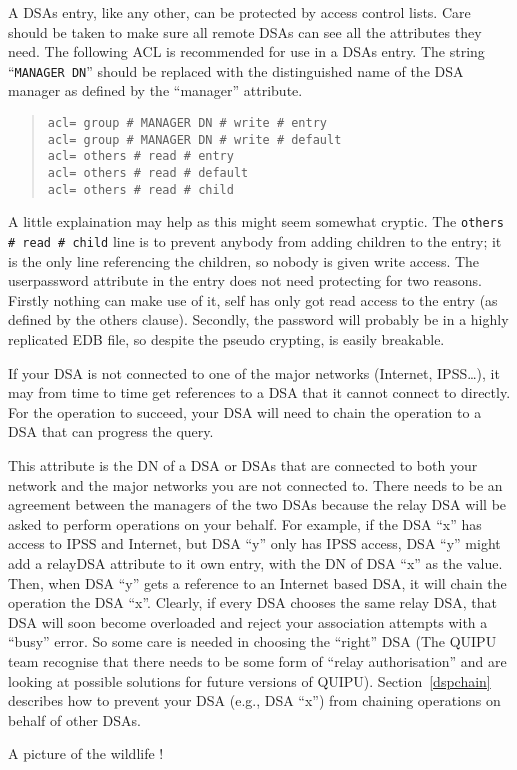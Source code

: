 \begin{describe}
\item[\verb+acl+:] A DSAs entry, like any other, can be protected by access
control lists.  Care should be taken to make sure 
all remote DSAs can
see all the attributes they need.  The following ACL is recommended
for use in a DSAs entry.  The string ``\verb+MANAGER DN+'' should be
replaced with the distinguished name of the DSA manager as defined by
the ``manager'' attribute.
\begin{quote}\small\begin{verbatim}
acl= group # MANAGER DN # write # entry
acl= group # MANAGER DN # write # default
acl= others # read # entry
acl= others # read # default
acl= others # read # child
\end{verbatim}\end{quote}
A little explaination may help as this might seem somewhat cryptic.
The \verb+others # read # child+
line is to prevent anybody from adding children to the entry; it is
the only line referencing the children, so nobody is given write
access.
The userpassword attribute in the entry does not need protecting for
two reasons.  Firstly nothing can make use of it, self has
only got read access to the entry (as defined by the others clause).
Secondly, the password will probably be in a highly replicated EDB
file, so despite the pseudo crypting, is easily breakable.

\item[\verb+relayDSA+:]\label{dsarelay} If 
your DSA is not connected to
one of the major networks (Internet, IPSS\ldots), it may from time to time
get references to a DSA that it cannot connect to directly.  For the
operation to succeed, your DSA will need to chain the operation to a
DSA that can progress the query.

This attribute is the DN of a DSA or DSAs that are connected to both your network and 
the major networks you are not connected to.
There needs to be an agreement between the managers of the two 
DSAs because the
relay DSA will be asked to perform operations on your behalf.
For example, if the DSA ``x'' has access to IPSS and Internet, but DSA ``y''
only has IPSS access, DSA ``y'' might add a relayDSA attribute to it own
entry, with the DN of DSA ``x'' as the value.
Then, when DSA ``y'' gets a reference to an Internet based DSA, it will chain
the operation the DSA ``x''.
Clearly, if every DSA chooses the same relay DSA, that DSA will soon
become overloaded and reject your association attempts with a ``busy''
error.  So some care is needed in choosing the ``right'' DSA (The
QUIPU team
recognise that there 
needs to be some form of ``relay authorisation'' and are
looking at possible solutions for future versions of QUIPU).
Section~\ref{dspchain} describes how to prevent your DSA (e.g., DSA ``x'') from
chaining operations on behalf of other DSAs.

\item[\verb+photo+:] A picture of the wildlife !

\end{describe}



